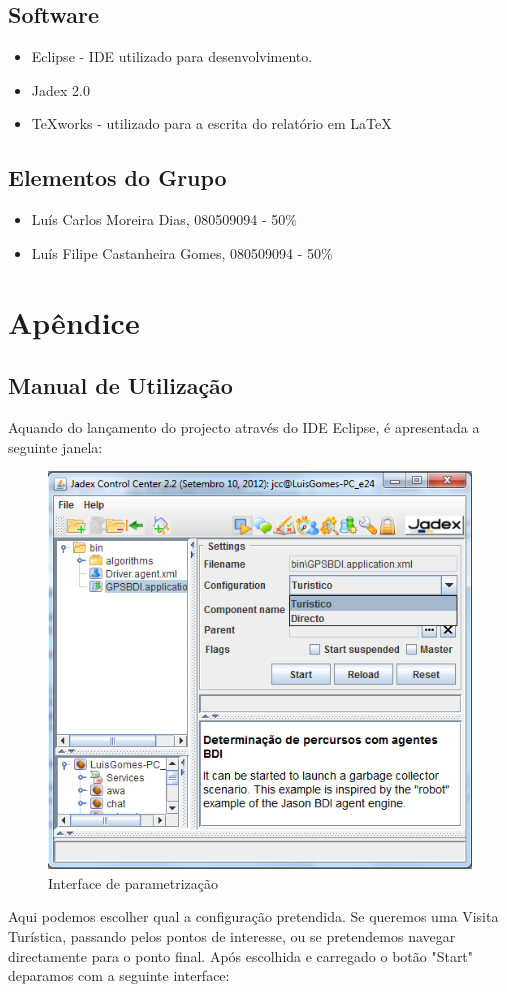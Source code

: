 \documentclass[15pt,a4paper]{article}
\begin{document}
\subsection{Software}

\begin{itemize}
\item Eclipse - IDE utilizado para desenvolvimento.
\item Jadex 2.0
\item TeXworks - utilizado para a escrita do relatório em LaTeX
\end{itemize}

\subsection{Elementos do Grupo}

\begin{itemize}
\item Luís Carlos Moreira Dias, 080509094 - 50\%
\item Luís Filipe Castanheira Gomes, 080509094 - 50\%
\end{itemize}

\newpage
\appendix
\section{Apêndice}
\subsection{Manual de Utilização}
Aquando do lançamento do projecto através do IDE Eclipse, é apresentada a seguinte janela:

\begin{figure}[htp]
  \centering
  \includegraphics {configuration_choose.png}
  \caption{Interface de parametrização}
\end{figure}
Aqui podemos escolher qual a configuração pretendida. Se queremos uma Visita Turística, passando pelos pontos de interesse, ou se pretendemos navegar directamente para o ponto final. 
Após escolhida e carregado o botão "Start" deparamos com a seguinte interface:
\end{document}
